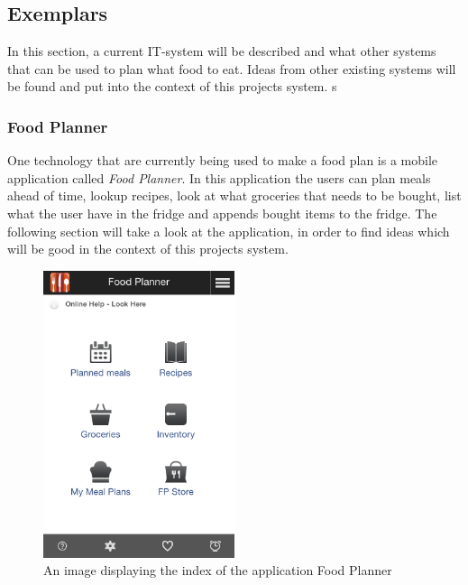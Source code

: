 \subsection{Exemplars} \label{IdeasLabel}
In this section, a current IT-system will be described and what other systems that can be used to plan what food to eat.
Ideas from other existing systems will be found and put into the context of this projects system. s

\subsubsection{Food Planner}
One technology that are currently being used to make a food plan is a mobile application called \textit{Food Planner}.
In this application the users can plan meals ahead of time, lookup recipes, look at what groceries that needs to be bought, list what the user have in the fridge and appends bought items to the fridge.
The following section will take a look at the application, in order to find ideas which will be good in the context of this projects system.

\begin{figure}[H]
    \centering
    \includegraphics[width=0.5\textwidth]{Grafik/FoodPlanner/index}
    \caption{An image displaying the index of the application Food Planner}
    \label{FoodPlannerIndex}
\end{figure}


